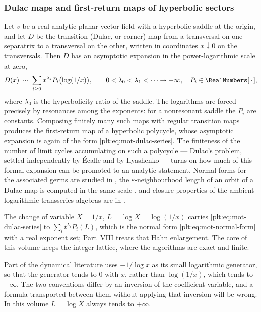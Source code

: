 \documentclass[11pt,oneside]{article}
\theoremstyle{plain}
\theoremstyle{definition}
\theoremstyle{remark}
\begin{document}
\subsubsection{Dulac maps and first-return maps of hyperbolic sectors}

Let \(v\) be a real analytic planar vector field with a hyperbolic saddle at
the origin, and let \(D\) be the transition (Dulac, or corner) map from a
transversal on one separatrix to a transversal on the other, written in
coordinates \(x\downarrow0\) on the transversals.  Then \(D\) has an asymptotic
expansion in the power-logarithmic scale at zero,
\begin{equation}\label{plt:eq:mot-dulac-series}
  D(x)\;\sim\;\sum_{i\ge0}x^{\lambda_{i}}P_{i}\bigl(\log(1/x)\bigr),
  \qquad
  0<\lambda_{0}<\lambda_{1}<\cdots\to+\infty,
  \quad P_{i}\in\RealNumbers[\,\cdot\,],
\end{equation}
where \(\lambda_{0}\) is the hyperbolicity ratio of the saddle.  The logarithms
are forced precisely by resonances among the exponents: for a nonresonant
saddle the \(P_{i}\) are constants.  Composing finitely many such maps with
regular transition maps produces the first-return map of a hyperbolic
polycycle, whose asymptotic expansion is again of the form
\eqref{plt:eq:mot-dulac-series}.  The finiteness of the number of limit cycles
accumulating on such a polycycle --- Dulac's problem, settled independently by
Écalle \cite{ecalle} and by Ilyashenko --- turns on how much of this formal
expansion can be promoted to an analytic statement.  Normal forms for the
associated germs are studied in \cite{mardesic-normalforms,resman-dulac}, the
\(\varepsilon\)-neighbourhood length of an orbit of a Dulac map is computed in
the same scale \cite{mardesic-length}, and closure properties of the ambient
logarithmic transseries algebras are in \cite{peran-logtransseries}.

The change of variable \(X=1/x\), \(L=\log X=\log(1/x)\) carries
\eqref{plt:eq:mot-dulac-series} to \(\sum_{i}t^{\lambda_{i}}P_{i}(L)\), which
is the normal form \eqref{plt:eq:mot-normal-form} with a real exponent set;
Part~VIII treats that Hahn enlargement.  The core of this volume keeps the
integer lattice, where the algorithms are exact and finite.

\begin{warningbox}
Part of the dynamical literature uses \(-1/\log x\) as its small logarithmic
generator, so that the generator tends to \(0\) with \(x\), rather than
\(\log(1/x)\), which tends to \(+\infty\).  The two conventions differ by an
inversion of the coefficient variable, and a formula transported between them
without applying that inversion will be wrong.  In this volume \(L=\log X\)
always tends to \(+\infty\).
\end{warningbox}
\end{document}
